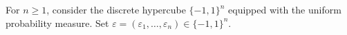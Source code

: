 For $n\geq 1$, consider the discrete hypercube $\{-1,1\}^n$ equipped with the uniform probability measure. Set $\varepsilon=(\varepsilon_{1}, \ldots, \varepsilon_{n}) \in \{-1,1\}^{n}$.
